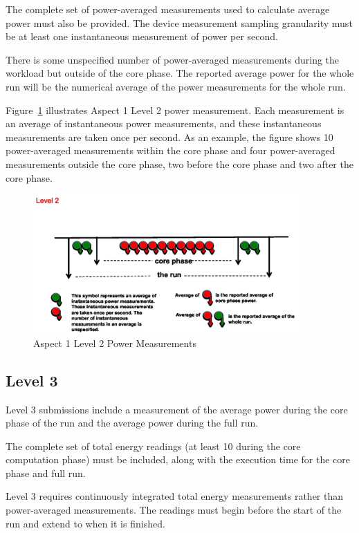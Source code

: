 \noindent
The complete set of power-averaged measurements used to calculate average power must also be provided.
The device measurement sampling granularity must be at least one instantaneous measurement of power per second.
\wl

\noindent
There is some unspecified number of power-averaged measurements during the workload but outside of the core phase. The reported average power for the whole run will be the numerical average of the power measurements for the whole run.  
\wl


\noindent
Figure~\ref{fig:a1l2pm} illustrates Aspect 1 Level 2 power measurement. Each measurement is an average of instantaneous power measurements, and these instantaneous measurements are taken once per second. As an example, the figure shows 10 power-averaged measurements within the core phase and four power-averaged measurements outside the core phase, two before the core phase and two after the core phase.

\begin{figure}
\centering
\includegraphics[width=4in]{fig3-4}
\caption{Aspect 1 Level 2 Power Measurements}
\label{fig:a1l2pm}
\end{figure}

\subsection{Level 3}
\noindent
Level 3 submissions include a measurement of the average power during the core phase of the run and the average power during the full run.
\wl

\noindent
The complete set of total energy readings (at least 10 during the core computation phase) must be included, along with the execution time for the core phase and full run. 
\wl

\noindent
Level 3 requires continuously integrated total energy measurements rather than power-averaged measurements. The readings must begin before the start of the run and extend to when it is finished.
\wl

